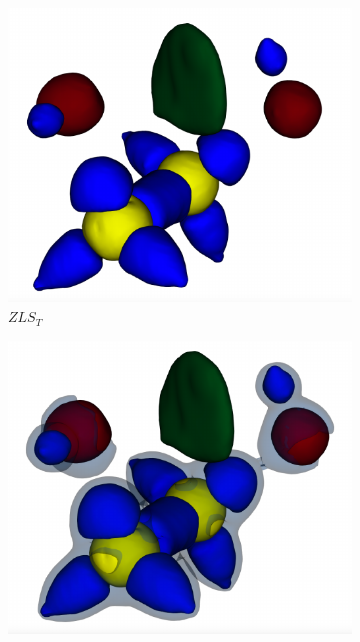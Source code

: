 \begin{figure}[!h]
\begin{subfigure}{0.16\linewidth}
\centering
\includegraphics[width=\linewidth]{Images/EthaneDiol/zls.pdf}
\caption{$ZLS_{T}$}
\label{fig:ethanediol_zls}
\end{subfigure}
\begin{subfigure}{0.16\linewidth}
\centering
\includegraphics[width=\linewidth]{Images/EthaneDiol/fcls_cb_68.pdf}

\end{subfigure}
\end{figure}
